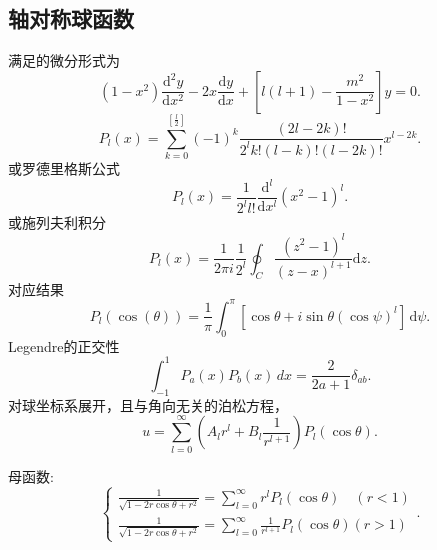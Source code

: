 \documentclass[12pt,a4paper,openany,twoside]{book}
\numberwithin{equation}{section}
\begin{document}
        \subsection{轴对称球函数}
          满足的微分形式为
          \begin{equation}
            (1-x^2) \frac{\mathrm{d}^2 y}{\mathrm{d}x^2} -2x \frac{\mathrm{d} y}{\mathrm{d} x} +\left[ l(l+1) - \frac{m^2}{1-x^2} \right] y = 0
          .
          \end{equation} 
          \begin{equation}
            P_l (x) = \sum_{k=0} ^{[\frac{l}{2} ]} (-1)^k \frac{(2l-2k)!}{2^l k! (l-k)! (l-2k)!} x^{l-2k}
          .
          \end{equation} 
          或罗德里格斯公式
          \begin{equation}
            P_l(x) = \frac{1}{2^l l!} \frac{\mathrm{d} ^l}{\mathrm{d} x^l} (x^2 -1 )^l
          .
          \end{equation} 
          或施列夫利积分
          \begin{equation}
            P_l(x) = \frac{1}{2\pi i} \frac{1}{2^l } \oint_C \frac{(z^2-1)^l}{(z-x)^{l+1}} \mathrm{d}z
          .
          \end{equation} 
          对应结果
          \begin{equation}
            P_l(\cos(\theta)) = \frac{1}{\pi} \int _0^\pi [\cos{\theta} + i \sin{\theta}(\cos{\psi})^l] \, \mathrm{d}\psi 
          .
          \end{equation} 
          Legendre的正交性
          \begin{equation}
            \int _{-1}^1 P_a(x) P_b(x) \, dx = \frac{2}{2a+1} \delta_{ab} 
          .
          \end{equation} 
          对球坐标系展开，且与角向无关的泊松方程，
          \begin{equation}
            u = \sum_{l=0} ^ \infty \left( A_l r^l + B_l \frac{1}{r^{l+1}}  \right) P_l (\cos{\theta})
          .
          \end{equation} 

          母函数:
          \begin{equation}
            \begin{cases}
              \frac{1}{\sqrt{1-2r\cos{\theta} + r^2}} = \sum _{l=0}^\infty r^l P_l (\cos{\theta}) \quad (r<1)\\
              \frac{1}{\sqrt{1-2r\cos{\theta} + r^2}} = \sum _{l=0} ^{\infty} \frac{1}{r^{l+1}} P_l (\cos{\theta}) (r>1)
              \end{cases}
          .
          \end{equation} 
\end{document}
